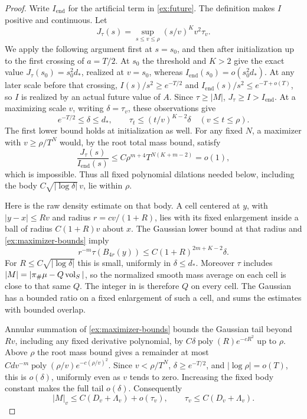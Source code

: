 \begin{proof}
Write \(I_{\mathrm{end}}\) for the artificial term in
\eqref{ex:future}. The definition makes \(I\) positive and continuous.
Let
\[
 J_\tau(s)=\sup_{s\le v\le\rho}(s/v)^K v^2\tau_v.
\]
We apply the following argument first at \(s=s_0\), and then after
initialization up to the first crossing of \(a=T/2\). At \(s_0\)
the threshold and \(K>2\) give the exact value
\(J_\tau(s_0)=s_0^2d_*\), realized at \(v=s_0\), whereas
\(I_{\mathrm{end}}(s_0)=o(s_0^2d_*)\).
At any later scale before that crossing,
\(I(s)/s^2\ge e^{-T/2}\) and
\(I_{\mathrm{end}}(s)/s^2\le e^{-T+o(T)}\), so \(I\) is
realized by an actual future value of \(A\). Since \(\tau\ge|M|\),
\(J_\tau\ge I>I_{\mathrm{end}}\). At a maximizing scale \(v\),
writing \(\delta=\tau_v\), these observations give
\begin{equation}
 e^{-T/2}\le\delta\le d_*,\qquad
 \tau_t\le(t/v)^{K-2}\delta\quad(v\le t\le\rho).
 \label{ex:maximizer-bounds}
\end{equation}
The first lower bound holds at initialization as well. For any fixed
\(N\), a maximizer with \(v\ge\rho/T^N\) would, by the root
total mass bound, satisfy
\[
 \frac{J_\tau(s)}{I_{\mathrm{end}}(s)}
 \le C\rho^{m+4}T^{N(K+m-2)}=o(1),
\]
which is impossible. Thus all fixed polynomial dilations needed
below, including the body \(C\sqrt{|\log\delta|}\,v\), lie
within \(\rho\).

Here is the raw density estimate on that body. A cell centered at
\(y\), with \(|y-x|\le Rv\) and radius
\(r=c v/(1+R)\), lies with its fixed enlargement inside a ball
of radius \(C(1+R)v\) about \(x\). The Gaussian lower bound at
that radius and \eqref{ex:maximizer-bounds} imply
\begin{equation}
 r^{-m}\tau(B_{4r}(y))
 \le C(1+R)^{2m+K-2}\delta.
 \label{ex:cell-density}
\end{equation}
For \(R\le C\sqrt{|\log\delta|}\) this is small, uniformly in
\(\delta\le d_*\). Moreover \(\tau\) includes
\(|M|=|\pi_\#\mu-Q\operatorname{vol}_S|\), so the normalized smooth mass
average on each cell is close to that same \(Q\). The integer in
 is therefore \(Q\) on every cell. The Gaussian
has a bounded ratio on a fixed enlargement of such a cell, and
 sums the estimates with bounded overlap.

Annular summation of \eqref{ex:maximizer-bounds} bounds the Gaussian
tail beyond \(Rv\), including any fixed derivative polynomial, by
\(C\delta\operatorname{poly}(R)e^{-cR^2}\) up to \(\rho\).
Above \(\rho\) the root mass bound gives a remainder at most
\(Cd v^{-m}\operatorname{poly}(\rho/v)e^{-c(\rho/v)^2}\).
Since \(v<\rho/T^N\), \(\delta\ge e^{-T/2}\), and
\(|\log\rho|=o(T)\), this is \(o(\delta)\), uniformly even
as \(v\) tends to zero. Increasing the fixed body constant makes
the full tail \(o(\delta)\). Consequently
\[
 |M|_v\le C(D_v+\Lambda_v)+o(\tau_v),\qquad
 \tau_v\le C(D_v+\Lambda_v).
\]


\end{proof}
